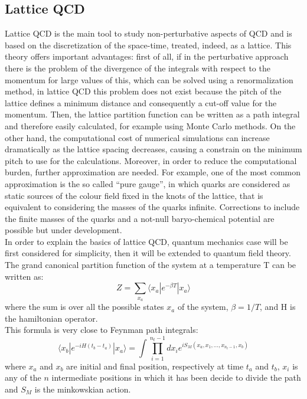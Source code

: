 \subsection{Lattice QCD}
%
Lattice QCD is the main tool to study non-perturbative aspects of QCD and is based on the discretization of the space-time, treated, indeed, as a lattice. This theory offers important advantages: first of all, if in the perturbative approach there is the problem of the divergence of the integrals with respect to the momentum for large values of this, which can be solved using a renormalization method, in lattice QCD this problem does not exist because the pitch of the lattice defines a minimum distance and consequently a cut-off value for the momentum. Then, the lattice partition function can be written as a path integral and therefore easily calculated, for example using Monte Carlo methods. On the other hand, the computational cost of numerical simulations can increase dramatically as the lattice spacing decreases, causing a constrain on the minimum pitch to use for the calculations. Moreover, in order to reduce the computational burden, further approximation are needed. For example, one of the most common approximation is the so called ``pure gauge'', in which quarks are considered as static sources of the colour field fixed in the knots of the lattice, that is equivalent to considering the masses of the quarks infinite. Corrections to include the finite masses of the quarks and a not-null baryo-chemical potential are possible but under development.\\
In order to explain the basics of lattice QCD, quantum mechanics case will be first considered for simplicity, then it will be extended to quantum field theory.
The grand canonical partition function of the system at a temperature T can be written as:
%
\begin{equation}
 Z = \sum\limits_{x_{a}}\langle x_{a} | e^{-\beta T} | x_{a} \rangle
\end{equation}
%
where the sum is over all the possible states $x_{a}$ of the system, $\beta=1/T$, and H is the hamiltonian operator.\\
This formula is very close to Feynman path integrals:
%
\begin{equation}
 \langle x_{b} | e^{- i H (t_{b} - t_{a})} | x_{a} \rangle = \int \prod\limits_{i=1}^{n_{t}-1} dx_{i} e^{i S_{M}(x_{a},x_{1},\dots,x_{n_{t}-1},x_{b})}
\end{equation}
where $x_{a}$ and $x_{b}$ are initial and final position, respectively at time $t_{a}$ and  $t_{b}$, $x_{i}$ is any of the $n$ intermediate positions in which it has been decide to divide the path and $S_{M}$ is the minkowskian action.\\
